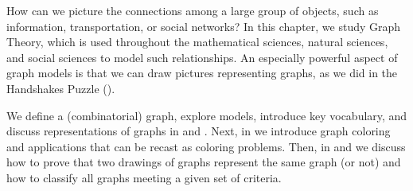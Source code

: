 How can we picture the connections among a large group of objects, such as information, transportation, or social networks?  In this chapter, we study Graph Theory, which is used throughout the mathematical sciences, natural sciences, and social sciences to model such relationships. An especially powerful aspect of graph models is that we can draw pictures representing graphs, as we did in the Handshakes Puzzle ().  

We define a (combinatorial) graph, explore models, introduce key vocabulary, and discuss representations of graphs in  {\secgraphmodels} and  {\secstdgraphs}. 
Next, in  {\seccolorgraphs} we introduce graph coloring and applications that can be recast as coloring problems.  Then, in  {\secsubgraphiso} and  {\secclassifygraphs} we discuss how to prove that two drawings of graphs represent the same graph (or not) and how to classify all graphs meeting a given set of criteria.

